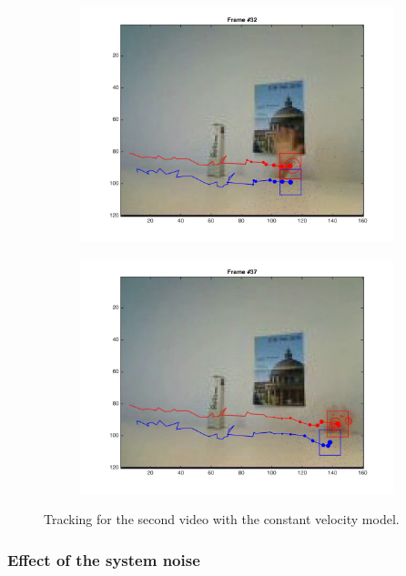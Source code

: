 \documentclass{ethz_report}
\begin{document}
\begin{figure}[H]
\begin{subfigure}[b]{.25\textwidth}
        \includegraphics[width=1\linewidth]{images/video2_model_31}
    \end{subfigure}%
    \begin{subfigure}[b]{.25\textwidth}
        \centering
        \includegraphics[width=1\linewidth]{images/video2_model_36}
    \end{subfigure}
    \caption{Tracking for the second video with the constant velocity model.}
    \label{fig:tracking_video2_model}
\end{figure}

\subsubsection*{Effect of the system noise}
\end{document}
